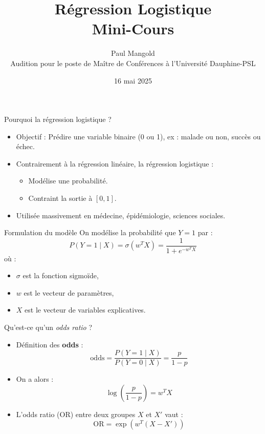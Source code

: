 \documentclass[aspectratio=169,12pt]{beamer}
\title{\LARGE Régression Logistique \\[0.5em]
\large Mini-Cours
\vspace{0em}}
\author{
  Paul Mangold \\[0.5em]
  Audition pour le poste de Maître de Conférences à l'Université Dauphine-PSL
}
\institute{}
\date{16 mai 2025}
\begin{document}

\begin{frame}[plain]
  \vspace{3.5em}
  \titlepage
\end{frame}
\addtocounter{framenumber}{-1}



\begin{frame}{Pourquoi la régression logistique ?}
\begin{itemize}
  \item Objectif : Prédire une variable binaire (0 ou 1), ex : malade ou non, succès ou échec.
  \item Contrairement à la régression linéaire, la régression logistique :
  \begin{itemize}
    \item Modélise une probabilité.
    \item Contraint la sortie à $[0,1]$.
  \end{itemize}
  \item Utilisée massivement en médecine, épidémiologie, sciences sociales.
\end{itemize}
\end{frame}

\begin{frame}{Formulation du modèle}
On modélise la probabilité que $Y = 1$ par :
\[
P(Y = 1 \mid X) = \sigma(w^T X) = \frac{1}{1 + e^{-w^T X}}
\]
où :
\begin{itemize}
  \item $\sigma$ est la fonction sigmoïde,
  \item $w$ est le vecteur de paramètres,
  \item $X$ est le vecteur de variables explicatives.
\end{itemize}
\end{frame}

\begin{frame}{Qu’est-ce qu’un \textit{odds ratio} ?}
\begin{itemize}
  \item Définition des \textbf{odds} : 
  \[
  \text{odds} = \frac{P(Y=1 \mid X)}{P(Y=0 \mid X)} = \frac{p}{1-p}
  \]
  \item On a alors :
  \[
  \log\left(\frac{p}{1-p}\right) = w^T X
  \]
  \item L’odds ratio (OR) entre deux groupes $X$ et $X'$ vaut :
  \[
  \text{OR} = \exp(w^T (X - X'))
  \]
\end{itemize}
\end{frame}
\end{document}
